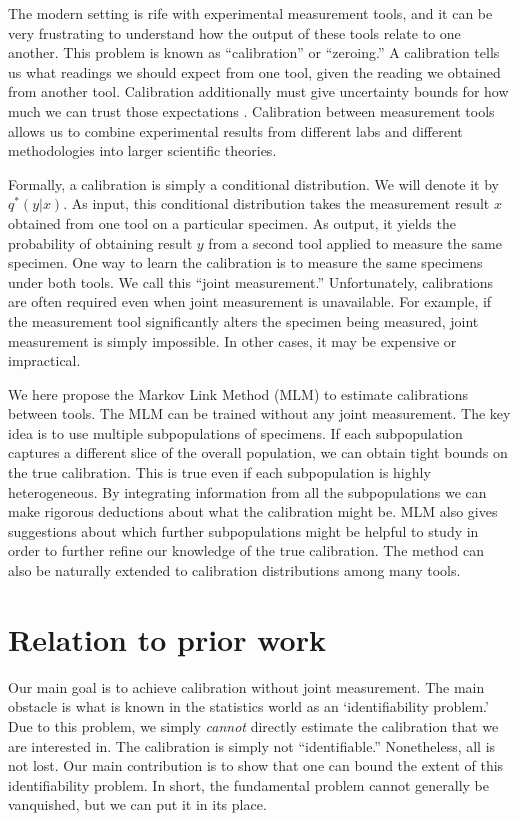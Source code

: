 The modern setting is rife with experimental measurement tools, and it can be very frustrating to understand how the output of these tools relate to one another.  This problem is known as ``calibration'' or ``zeroing.''  A calibration tells us what readings we should expect from one tool, given the reading we obtained from another tool.   Calibration additionally must give uncertainty bounds for how much we can trust those expectations  \cite{bipm2008international}.  Calibration between measurement tools allows us to combine experimental results from different labs and different methodologies into larger scientific theories.  

Formally, a calibration is simply a conditional distribution.  We will denote it by $q^*(y|x)$.  As input, this conditional distribution takes the measurement result $x$ obtained from one tool on a particular specimen.  As output, it yields the probability of obtaining result $y$ from a second tool applied to measure the same specimen.  One way to learn the calibration is to measure the same specimens under both tools.  We call this ``joint measurement.''  Unfortunately, calibrations are often required even when joint measurement is unavailable.  For example, if the measurement tool significantly alters the specimen being measured, joint measurement is simply impossible.  In other cases, it may be expensive or impractical.

We here propose the Markov Link Method (MLM) to estimate calibrations between tools.  The MLM can be trained without any joint measurement.  The key idea is to use multiple subpopulations of specimens.  If each subpopulation captures a different slice of the overall population, we can obtain tight bounds on the true calibration.  This is true even if each subpopulation is highly heterogeneous.  By integrating information from all the subpopulations we can make rigorous deductions about what the calibration might be.  MLM also gives suggestions about which further subpopulations might be helpful to study in order to further refine our knowledge of the true calibration.  The method can also be naturally extended to calibration distributions among many tools.

\section{Relation to prior work}

Our main goal is to achieve calibration without joint measurement.  The main obstacle is what is known in the statistics world as an `identifiability problem.'  Due to this problem, we simply \emph{cannot} directly estimate the calibration that we are interested in.  The calibration is simply not ``identifiable.''  Nonetheless, all is not lost.  Our main contribution is to show that one can bound the extent of this identifiability problem.  In short, the fundamental problem cannot generally be vanquished, but we can put it in its place.  

